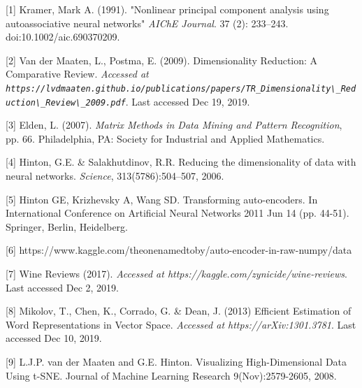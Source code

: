 \documentclass{article}
\begin{document}
[1] Kramer, Mark A. (1991). "Nonlinear principal component analysis using autoassociative neural networks" {\it AIChE Journal}. 37 (2): 233–243. doi:10.1002/aic.690370209.

[2] Van der Maaten, L., Postma, E. (2009). Dimensionality Reduction: A Comparative Review. {\it Accessed at \verb+https://lvdmaaten.github.io/publications/papers/TR_Dimensionality\_Reduction\_Review\_2009.pdf+}. Last accessed Dec 19, 2019.

[3] Elden, L. (2007). {\it Matrix Methods in Data Mining and Pattern Recognition}, pp. 66. Philadelphia, PA:  Society for Industrial and Applied Mathematics.

[4] Hinton, G.E. \& Salakhutdinov, R.R. Reducing the dimensionality of data with neural networks. {\it Science}, 313(5786):504–507, 2006.

[5] Hinton GE, Krizhevsky A, Wang SD. Transforming auto-encoders. In International Conference on Artificial Neural Networks 2011 Jun 14 (pp. 44-51). Springer, Berlin, Heidelberg.

[6] https://www.kaggle.com/theonenamedtoby/auto-encoder-in-raw-numpy/data

[7] Wine Reviews (2017). {\it Accessed at https://kaggle.com/zynicide/wine-reviews}. Last accessed Dec 2, 2019.

[8] Mikolov, T., Chen, K., Corrado, G. \& Dean, J. (2013) Efficient Estimation of Word Representations in Vector Space. {\it Accessed at https://arXiv:1301.3781}. Last accessed Dec 10, 2019.

[9] L.J.P. van der Maaten and G.E. Hinton. Visualizing High-Dimensional Data Using t-SNE. Journal of Machine Learning Research 9(Nov):2579-2605, 2008.








\end{document}
